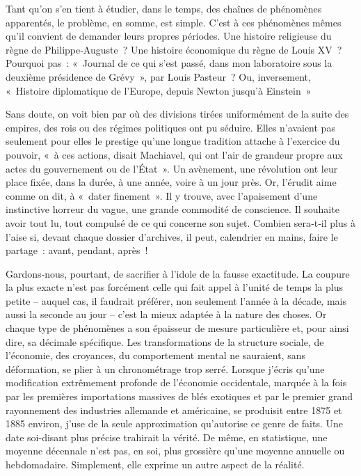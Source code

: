 \documentclass[french,twoside]{book} %
\newcommand{\astermono}{\medskip\centerline{\color{rubric}\large\selectfont{\syms ✻}}\medskip\par}%
\begin{document}
\astermono

\noindent Tant qu’on s’en tient à étudier, dans le temps, des chaînes de phéno­mènes apparentés, le problème, en somme, est simple. C’est à ces phéno­mènes mêmes qu’il convient de demander leurs propres périodes. Une histoire religieuse du règne de Philippe‑Auguste ? Une histoire écono­mique du règne de Louis XV ? Pourquoi pas : « Journal de ce qui s’est passé, dans mon laboratoire sous la deuxième présidence de Grévy », par Louis Pasteur ? Ou, inversement, « Histoire diplomatique de l’Europe, depuis Newton jusqu’à Einstein »\par
Sans doute, on voit bien par où des divisions tirées uniformément de la suite des empires, des rois ou des régimes politiques ont pu séduire. Elles n’avaient pas seulement pour elles le prestige qu’une longue tradition attache à l’exercice du pouvoir, « à ces actions, disait Machiavel, qui ont l’air de grandeur propre aux actes du gouvernement ou de l’État ». Un avènement, une révolution ont leur place fixée, dans la durée, à une année, voire à un jour près. Or, l’érudit aime comme on dit, à « dater finement ». Il y trouve, avec l’apaisement d’une instinctive horreur du vague, une grande commodité de conscience. Il souhaite avoir tout lu, tout compulsé de ce qui concerne son sujet. Combien sera‑t‑il plus à l’aise si, devant chaque dossier d’archives, il peut, calendrier en mains, faire le partage : avant, pendant, après !\par
Gardons‑nous, pourtant, de sacrifier à l’idole de la fausse exactitude. La coupure la plus exacte n’est pas forcément celle qui fait appel à l’unité de temps la plus petite – auquel cas, il faudrait préférer, non seulement l’année à la décade, mais aussi la seconde au jour – c’est la mieux adaptée à la nature des choses. Or chaque type de phénomènes a son épaisseur  
\label{p94} de mesure particulière et, pour ainsi dire, sa décimale spécifique. Les transformations de la structure sociale, de l’économie, des croyances, du comportement mental ne sauraient, sans déformation, se plier à un chro­nométrage trop serré. Lorsque j’écris qu’une modification extrêmement profonde de l’économie occidentale, marquée à la fois par les premières importations massives de blés exotiques et par le premier grand rayon­nement des industries allemande et américaine, se produisit entre 1875 et 1885 environ, j’use de la seule approximation qu’autorise ce genre de faits. Une date soi-disant plus précise trahirait la vérité. De même, en statistique, une moyenne décennale n’est pas, en soi, plus grossière qu’une moyenne annuelle ou hebdomadaire. Simplement, elle exprime un autre aspect de la réalité.\par
\end{document}
